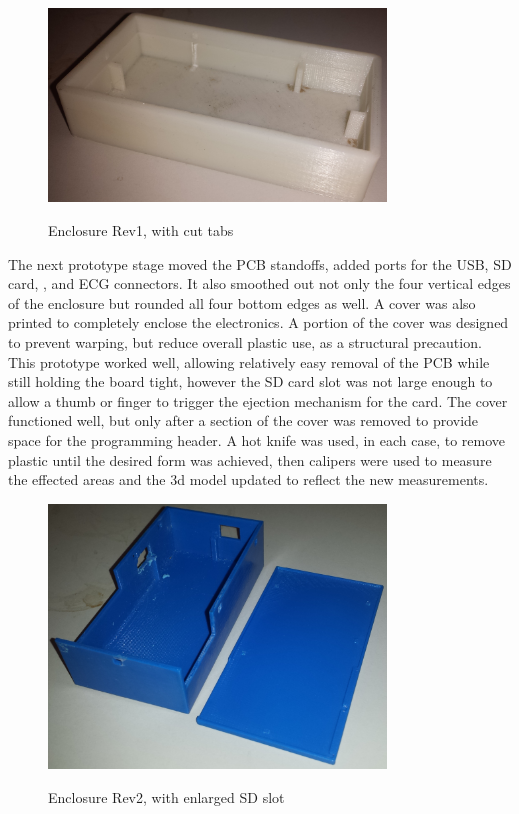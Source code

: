 \begin{figure}[h]
 \begin{center}
  \label{fig:enclosure1}
  \includegraphics[scale=1,width=0.8\textwidth]{Images/Enclosure1.png} 
  \caption{Enclosure Rev1, with cut tabs}
 
 \end{center}
\end{figure}


The next prototype stage moved the PCB standoffs, added ports for the USB, SD card, , and ECG connectors. It also smoothed out not only the four vertical edges of the enclosure but rounded all four bottom edges as well. A cover was also printed to completely enclose the electronics. A portion of the cover was designed to prevent warping, but reduce overall plastic use, as a structural precaution. This prototype worked well, allowing relatively easy removal of the PCB while still holding the board tight, however the SD card slot was not large enough to allow a thumb or finger to trigger the ejection mechanism for the card. The cover functioned well, but only after a section of the cover was removed to provide space for the programming header.  A hot knife was used, in each case, to remove plastic until the desired form was achieved, then calipers were used to measure the effected areas and the 3d model updated to reflect the new measurements.
\begin{figure}[h]
 \begin{center}
  \label{fig:enclosure2}
  \includegraphics[scale=1,width=0.8\textwidth]{Images/Enclosure2.png} 
  \caption{Enclosure Rev2, with enlarged SD slot}
 
 \end{center}
\end{figure}


